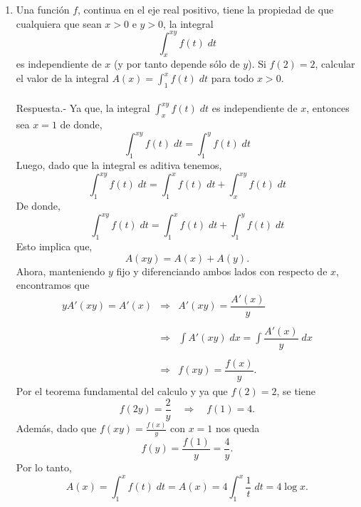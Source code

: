 \begin{enumerate}[\bfseries 1.]
    \item Una función $f$, continua en el eje real positivo, tiene la propiedad de que cualquiera que sean $x>0$ e $y>0$, la integral
    $$\int_{x}^{xy} f(t)\; dt$$
    es independiente de $x$ (y por tanto depende sólo de $y$). Si $f(2)=2$, calcular el valor de la integral $A(x)=\int_1^x f(t)\; dt$ para todo $x>0$.\\\\
    Respuesta.-\; Ya que, la integral $\displaystyle\int_x^{xy}f(t)\; dt$ es independiente de $x$, entonces sea $x=1$ de donde,
    $$\int_1^{xy} f(t)\; dt = \int_1^y f(t)\; dt$$
    Luego, dado que la integral es aditiva tenemos,
    $$\int_1^{xy} f(t)\; dt = \int_1^x f(t)\; dt + \int_x^{xy} f(t)\; dt$$
    De donde,
    $$\int_1^{xy} f(t)\; dt = \int_1^x f(t)\; dt + \int_1^{y} f(t)\; dt$$
    Esto implica que,
    $$A(xy)=A(x)+A(y).$$
    Ahora, manteniendo $y$ fijo y diferenciando ambos lados con respecto de $x$, encontramos que 	
    $$
    \begin{array}{rcl}
	yA'(xy) = A'(x) &\Rightarrow& A'(xy)=\dfrac{A'(x)}{y}\\\\
			&\Rightarrow& \displaystyle\int A'(xy)\; dx = \int \dfrac{A'(x)}{y}\; dx\\\\
			&\Rightarrow& f(xy)=\dfrac{f(x)}{y}.
    \end{array}
    $$
    Por el teorema fundamental del calculo y ya que $f(2)=2$, se tiene
    $$f(2y)=\dfrac{2}{y}\quad \Rightarrow\quad f(1)=4.$$
    Además, dado que $f(xy)=\frac{f(x)}{y}$ con $x=1$ nos queda
    $$f(y)=\dfrac{f(1)}{y}=\dfrac{4}{y}.$$
    Por lo tanto,
    $$A(x)=\int_1^x f(t)\; dt = A(x)=4\int_1^x \dfrac{1}{t}\; dt = 4\log x.$$\\



\end{enumerate}
